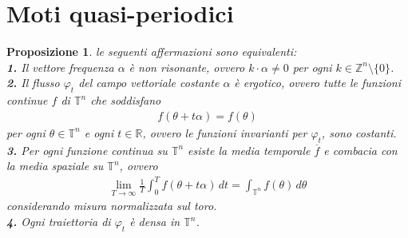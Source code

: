 \documentclass[twoside, 11pt]{amsbook}
\newcommand{\0}{{(0)}}
\newcommand{\3}{{(3)}}
\theoremstyle{colonplain}
\newtheorem{prop}[thm]{Proposizione}
\theoremstyle{colondefinition}
\theoremstyle{colonremark}
\numberwithin{equation}{chapter}
\begin{document}
\section{Moti quasi-periodici}
\begin{prop}\label{NonResErgFlowEq} le seguenti affermazioni sono equivalenti: \\
\textbf{1.} Il vettore frequenza $\alpha$ è \textit{non risonante}, ovvero $k \cdot \alpha \neq 0$ per ogni $k \in \mathbb{Z}^n \setminus \{0\}$. \\
\textbf{2.} Il flusso $\varphi_t$ del campo vettoriale costante $\alpha$ è \textit{ergotico}, ovvero tutte le funzioni continue $f$ di $\mathbb{T}^n$ che soddisfano
\begin{align}
    f(\theta + t\alpha) = f(\theta)
\end{align}
per ogni $\theta \in \mathbb{T}^n$ e ogni $t \in \mathbb{R}$, ovvero le funzioni invarianti per $\varphi_t$, sono costanti. \\
\textbf{3.} Per ogni funzione continua su $\mathbb{T}^n$ esiste la media temporale $\overline{f}$ e combacia con la media spaziale su $\mathbb{T}^n$, ovvero
\begin{align}\label{time/spaceMean}
    \lim_{T \rightarrow \infty}\frac{1}{T}\int_0^T f(\theta + t\alpha) \, dt = \int_{\mathbb{T}^n} f(\theta) \, d\theta
\end{align}
considerando misura normalizzata sul toro. \\
\textbf{4.} Ogni traiettoria di $\varphi_t$ è densa in $\mathbb{T}^n$.
\end{prop}
\end{document}

